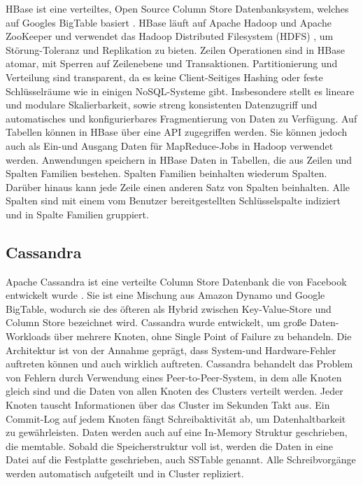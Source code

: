 HBase ist eine verteiltes, Open Source Column Store Datenbanksystem, welches auf Googles BigTable basiert \cite{Chang:2006:BDS:1267308.1267323}. HBase läuft auf Apache Hadoop und Apache ZooKeeper  \cite{Hunt:2010:ZWC:1855840.1855851} und verwendet das Hadoop Distributed Filesystem (HDFS) \cite{Shvachko:2010:HDF:1913798.1914427}, um Störung-Toleranz und Replikation zu bieten. Zeilen Operationen sind in HBase atomar, mit Sperren auf Zeilenebene und Transaktionen. Partitionierung und Verteilung sind transparent, da es keine Client-Seitiges Hashing oder feste Schlüsselräume wie in einigen NoSQL-Systeme gibt. 
Insbesondere stellt es lineare und modulare Skalierbarkeit, sowie streng konsistenten Datenzugriff und automatisches und konfigurierbares Fragmentierung von Daten zu Verfügung. Auf Tabellen können in HBase über eine API zugegriffen werden. Sie können jedoch auch als Ein-und Ausgang Daten für MapReduce-Jobs in Hadoop verwendet werden. Anwendungen speichern in HBase Daten in Tabellen, die aus Zeilen und Spalten Familien bestehen. Spalten Familien beinhalten wiederum Spalten. Darüber hinaus kann jede Zeile einen anderen Satz von Spalten beinhalten. Alle Spalten sind mit einem vom Benutzer bereitgestellten Schlüsselspalte indiziert und in Spalte Familien gruppiert.

\subsection{Cassandra} 
\label{ch:AnalyseDatenbanken:sec:Datenbanken:subsec:Cassandra}
Apache Cassandra ist eine verteilte Column Store Datenbank die von Facebook entwickelt wurde \cite{Lakshman:2010:CDS:1773912.1773922}. Sie ist eine Mischung aus Amazon Dynamo und Google BigTable, wodurch sie des öfteren als Hybrid zwischen Key-Value-Store und Column Store bezeichnet wird. Cassandra wurde entwickelt, um große Daten-Workloads über mehrere Knoten, ohne Single Point of Failure zu behandeln. Die Architektur ist von der Annahme geprägt, dass System-und Hardware-Fehler auftreten können und auch wirklich auftreten. Cassandra behandelt das Problem von Fehlern durch Verwendung eines Peer-to-Peer-System, in dem alle Knoten gleich sind und die Daten von allen Knoten des Clusters verteilt werden. Jeder Knoten tauscht Informationen über das Cluster im Sekunden Takt aus. Ein Commit-Log auf jedem Knoten fängt Schreibaktivität ab, um Datenhaltbarkeit zu gewährleisten. Daten werden auch auf eine In-Memory Struktur geschrieben, die memtable. Sobald die Speicherstruktur voll ist, werden die Daten in eine Datei auf die Festplatte geschrieben, auch SSTable genannt. Alle Schreibvorgänge werden automatisch aufgeteilt und in Cluster repliziert. 

